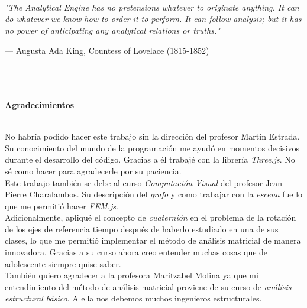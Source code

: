 \newpage
\thispagestyle{empty} \textbf{}\normalsize
\\\\\\%

\begin{flushright}
    \begin{minipage}{10cm}
        \noindent
        \small
        \emph{"The Analytical Engine has no pretensions whatever to originate anything. It can do whatever we know how to order it to perform. It can follow analysis; but it has no power of anticipating any analytical relations or truths."}
        \bigskip

        --- Augusta Ada King, Countess of Lovelace (1815-1852)\\
    \end{minipage}
\end{flushright}

\newpage{\pagestyle{empty}\cleardoublepage}

\newpage
\thispagestyle{empty} \textbf{}\normalsize
\\\\\\%
\textbf{\LARGE Agradecimientos}
\\ %

No habría podido hacer este trabajo sin la dirección del profesor Martín Estrada. Su conocimiento del mundo de la programación me ayudó en momentos decisivos durante el desarrollo del código. Gracias a él trabajé con la librería \emph{Three.js}. No sé como hacer para agradecerle por su paciencia.\\

Este trabajo también se debe al curso \emph{Computación Visual} del profesor Jean Pierre Charalambos. Su descripción del \emph{grafo} y como trabajar con la \emph{escena} fue lo que me permitió hacer \emph{FEM.js}.\\

Adicionalmente, apliqué el concepto de \emph{cuaternión} en el problema de la rotación de los ejes de referencia tiempo después de haberlo estudiado en una de sus clases, lo que me permitió implementar el método de análisis matricial de manera innovadora. Gracias a su curso ahora creo entender muchas cosas que de adolescente siempre quise saber.\\

También quiero agradecer a la profesora Maritzabel Molina ya que mi entendimiento del método de análisis matricial proviene de su curso de \emph{análisis estructural básico}. A ella nos debemos muchos ingenieros estructurales.\\

